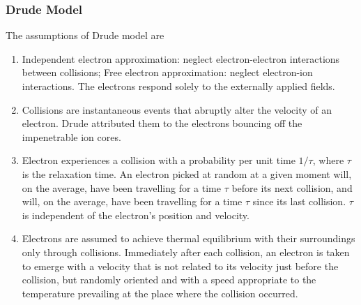 \documentclass[a4paper]{article}
\begin{document}
\subsubsection*{Drude Model}
\begin{Note}
The assumptions of Drude model are
\begin{enumerate}
    \item Independent electron approximation: neglect electron-electron interactions between collisions; Free electron approximation: neglect electron-ion interactions. The electrons respond solely to the externally applied fields.
    \item Collisions are instantaneous events that abruptly alter the velocity of an electron. Drude attributed them to the electrons bouncing off the impenetrable ion cores.
    \item Electron experiences a collision with a probability per unit time $1/\tau$, where $\tau$ is the relaxation time. An electron picked at random at a given moment will, on the average, have been travelling for a time $\tau$ before its next collision, and will, on the average, have been travelling for a time $\tau$ since its last collision. $\tau$ is independent of the electron's position and velocity.
    \item Electrons are assumed to achieve thermal equilibrium with their surroundings only through collisions. Immediately after each collision, an electron is taken to emerge with a velocity that is not related to its velocity just before the collision, but randomly oriented and with a speed appropriate to the temperature prevailing at the place where the collision occurred.
\end{enumerate}
\end{Note}
\end{document}
